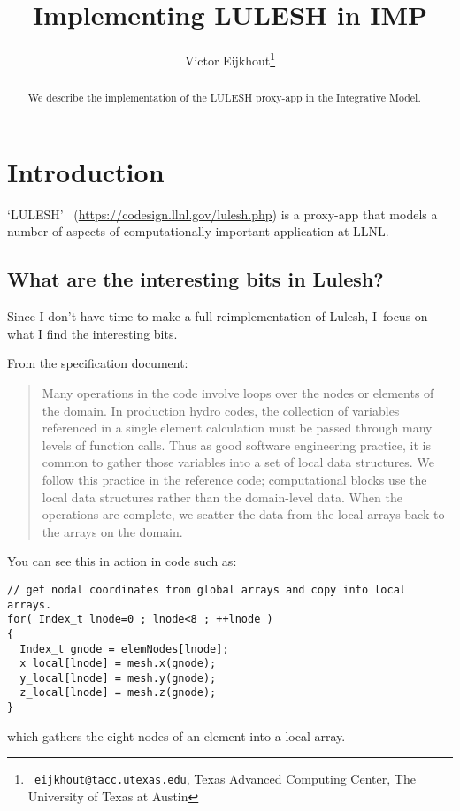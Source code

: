 \documentclass[11pt,fleqn,preprint]{impreport}
\title[LULESH in IMP]{Implementing LULESH in IMP}
\author[Eijkhout]{Victor Eijkhout\thanks{{\tt
      eijkhout@tacc.utexas.edu}, Texas Advanced Computing Center, The
    University of Texas at Austin}}
\begin{document}
\maketitle

\begin{abstract}
  We describe the implementation of the LULESH proxy-app in the
  Integrative Model.
\end{abstract}

\acresetall

\section{Introduction}

`\acf{LULESH}'~\cite{LULESH:spec}
(\url{https://codesign.llnl.gov/lulesh.php}) is a proxy-app that models a number
of aspects of computationally important application at \acf{LLNL}.

\subsection{What are the interesting bits in Lulesh?}

Since I don't have time to make a full reimplementation of Lulesh,
I~focus on what I find the interesting bits.

From the specification document:
\begin{quote}
  Many operations in the code involve loops over the nodes or elements
  of the domain. In production hydro codes, the collection of
  variables referenced in a single element calculation must be passed
  through many levels of function calls. Thus as good software
  engineering practice, it is common to gather those variables into a
  set of local data structures. We follow this practice in the
  reference code; computational blocks use the local data structures
  rather than the domain-level data. When the operations are complete,
  we scatter the data from the local arrays back to the arrays on the domain.
\end{quote}

You can see this in action in code such as:
\begin{verbatim}
// get nodal coordinates from global arrays and copy into local arrays.
for( Index_t lnode=0 ; lnode<8 ; ++lnode )
{
  Index_t gnode = elemNodes[lnode];
  x_local[lnode] = mesh.x(gnode);
  y_local[lnode] = mesh.y(gnode);
  z_local[lnode] = mesh.z(gnode);
}
\end{verbatim}
which gathers the eight nodes of an element into a local array.
\end{document}
